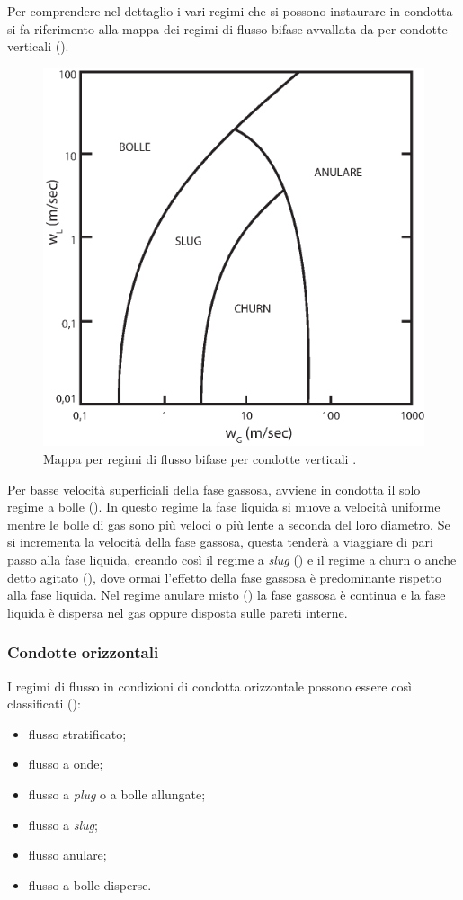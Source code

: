 Per comprendere nel dettaglio i vari regimi che si possono instaurare in condotta si fa riferimento alla mappa dei regimi di flusso bifase avvallata da \textcite{griffith1984multiphase} per condotte verticali ().

\begin{figure}[htbp]
    \centering
    \includegraphics[width=.6\textwidth]{fig/fluidodinamica/ver-griffith.eps}
    \caption{Mappa per regimi di flusso bifase per condotte verticali \parencite{griffith1984multiphase}.}
    \label{fig:ver-griffith}
\end{figure}

Per basse velocità superficiali della fase gassosa, avviene in condotta il solo regime a bolle (). In questo regime la fase liquida si muove a velocità uniforme mentre le bolle di gas sono più veloci o più lente a seconda del loro diametro. Se si incrementa la velocità della fase gassosa, questa tenderà a viaggiare di pari passo alla fase liquida, creando così il regime a \textit{slug} () e il regime a churn o anche detto agitato (), dove ormai l'effetto della fase gassosa è predominante rispetto alla fase liquida. Nel regime anulare misto () la fase gassosa è continua e la fase liquida è dispersa nel gas oppure disposta sulle pareti interne.

\subsubsection{Condotte orizzontali}
I regimi di flusso in condizioni di condotta orizzontale possono essere così classificati ():
\begin{itemize} 
    \item flusso stratificato;
    \item flusso a onde;
    \item flusso a \textit{plug} o a bolle allungate;
    \item flusso a \textit{slug};
    \item flusso anulare;
    \item flusso a bolle disperse.
\end{itemize} 

